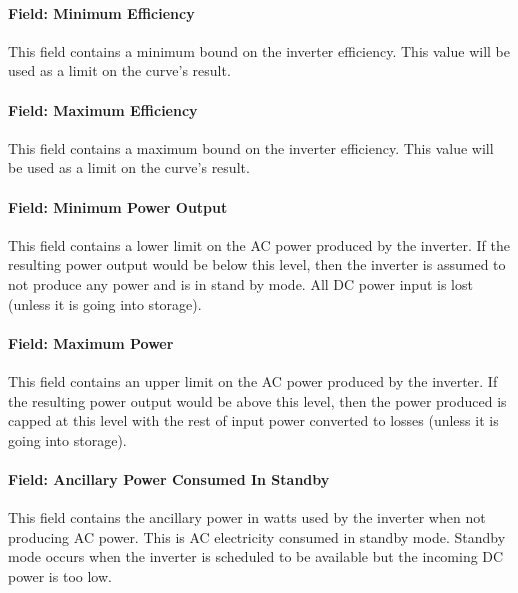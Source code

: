 \paragraph{Field: Minimum Efficiency}\label{field-minimum-efficiency}

This field contains a minimum bound on the inverter efficiency. This value will be used as a limit on the curve's result.

\paragraph{Field: Maximum Efficiency}\label{field-maximum-efficiency}

This field contains a maximum bound on the inverter efficiency. This value will be used as a limit on the curve's result.

\paragraph{Field: Minimum Power Output}\label{field-minimum-power-output}

This field contains a lower limit on the AC power produced by the inverter. If the resulting power output would be below this level, then the inverter is assumed to not produce any power and is in stand by mode. All DC power input is lost (unless it is going into storage).

\paragraph{Field: Maximum Power}\label{field-maximum-power}

This field contains an upper limit on the AC power produced by the inverter. If the resulting power output would be above this level, then the power produced is capped at this level with the rest of input power converted to losses (unless it is going into storage).

\paragraph{Field: Ancillary Power Consumed In Standby}\label{field-ancillary-power-consumed-in-standby}

This field contains the ancillary power in watts used by the inverter when not producing AC power. This is AC electricity consumed in standby mode. Standby mode occurs when the inverter is scheduled to be available but the incoming DC power is too low.

